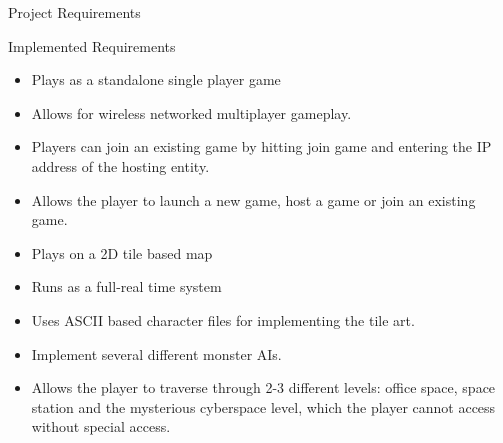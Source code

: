 \begin{chapter}{Project Requirements}
\begin{section}{Implemented Requirements}
	\begin{itemize}
		\item Plays as a standalone single player game
		\item Allows for wireless networked multiplayer gameplay.
		\item Players can join an existing game by hitting join game and entering the IP address of the hosting entity.
		\item Allows the player to launch a new game, host a game or join an existing game.
		\item Plays on a 2D tile based map
		\item Runs as a full-real time system
		\item Uses ASCII based character files for implementing the tile art.
		\item Implement several different monster AIs.
		\item Allows the player to traverse through 2-3 different levels: office space, space station and the mysterious cyberspace level, which the player cannot access without special access.
	\end{itemize}
\end{section}
\end{chapter}
